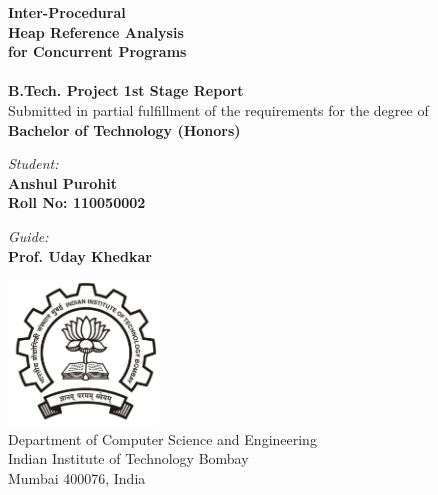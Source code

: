 \begin{titlepage}
\begin{center}

{\Huge \bfseries
Inter-Procedural \\
Heap Reference Analysis \\
for Concurrent Programs\\
}~\\[1cm]


{\large \bfseries
B.Tech. Project 1st Stage Report
}~\\[0.40cm]

{
Submitted in partial fulfillment of the requirements for the degree of
}~\\[0.20cm]

{\large \bfseries
Bachelor of Technology (Honors)
}\\[2.75cm]
\end{center}

\begin{multicols}{2}
\begin{flushleft}
{\large
\textit{Student:} \\
\textbf{Anshul Purohit} \\
\textbf{Roll No: 110050002}
}
\end{flushleft}
\columnbreak
\begin{flushright}
{\large
\textit{Guide:} \\
\textbf{Prof. Uday Khedkar}
}
\end{flushright}
\end{multicols}

\vfill

\begin{center}
\includegraphics[width=4cm]{Figures/iitbblack.jpg}~\\[1cm]

{\large
Department of Computer Science and Engineering\\
Indian Institute of Technology Bombay\\
Mumbai 400076, India\\
}

\end{center}
\end{titlepage}